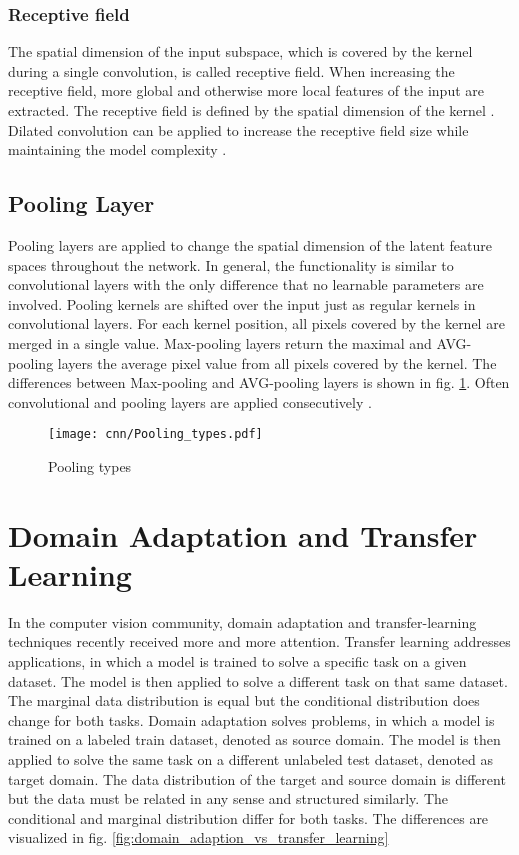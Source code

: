 \subsubsection{Receptive field}
The spatial dimension of the input subspace, which is covered by the kernel during a single convolution, is called receptive field. When increasing the receptive field, more global and otherwise more local features of the input are extracted. The receptive field is defined by the spatial dimension of the kernel \cite{OShea2015}. Dilated convolution can be applied to increase the receptive field size while maintaining the model complexity \cite{Dai2017}. 

\subsection{Pooling Layer}
Pooling layers are applied to change the spatial dimension of the latent feature spaces throughout the network. In general, the functionality is similar to convolutional layers with the only difference that no learnable parameters are involved. Pooling kernels are shifted over the input just as regular kernels in convolutional layers. For each kernel position, all pixels covered by the kernel are merged in a single value. Max-pooling layers return the maximal and AVG-pooling layers the average pixel value from all pixels covered by the kernel. The differences between Max-pooling and AVG-pooling layers is shown in fig. \ref{fig:Pooling_types}. Often convolutional and pooling layers are applied consecutively \cite{OShea2015}.

\begin{figure}[H]
  \centering
  \texttt{[image: cnn/Pooling\_types.pdf]}
  \caption {Pooling types}
  \label{fig:Pooling_types}
\end{figure}

\section{Domain Adaptation and Transfer Learning}

In the computer vision community, domain adaptation and transfer-learning techniques recently received more and more attention. Transfer learning addresses applications, in which a model is trained to solve a specific task on a given dataset. The model is then applied to solve a different task on that same dataset. The marginal data distribution is equal but the conditional distribution does change for both tasks. Domain adaptation solves problems, in which a model is trained on a labeled train dataset, denoted as source domain. The model is then applied to solve the same task on a different unlabeled test dataset, denoted as target domain. The data distribution of the target and source domain is different but the data must be related in any sense and structured similarly. The conditional and marginal distribution differ for both tasks. The differences are visualized in fig. \ref{fig:domain_adaption_vs_transfer_learning}

